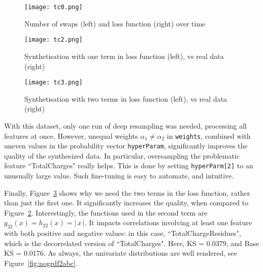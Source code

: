 \documentclass[oneside,10pt]{book}
\begin{document}
\begin{figure}[H]
\centering
\texttt{[image: tc0.png]} %
\caption{Number of swaps (left) and loss function (right) over time}
\label{fig:nofds2abcgff}
\end{figure}


\begin{figure}[H]
\centering
\texttt{[image: tc2.png]} %
\caption{Synthetisation with one term in loss function (left), vs real data (right)}
\label{fig:nofds2abchh}
\end{figure}

\begin{figure}[H]
\centering
\texttt{[image: tc3.png]} %
\caption{Synthetisation with two terms in loss function (left), vs real data (right)}
\label{fig:nogrdf2abchh}
\end{figure}

With this dataset, only one run of deep resampling was needed, processing all features at once. However, unequal weights $\alpha_1 \neq \alpha_2$ in \texttt{weights}, combined with uneven values in the probability vector \texttt{hyperParam}, significantly improves the quality of
 the synthesized data. In particular, oversampling the problematic feature ``TotalCharges" really helps. This is done
 by setting \texttt{hyperParm[2]} to an unusually large value. Such fine-tuning is easy to automate, and intuitive. 

Finally, Figure~\ref{fig:nogrdf2abchh} shows why we need the two terms in the loss function, rather than just the first one. 
It significantly increases the quality, when compared to Figure~\ref{fig:nofds2abchh}. Interestingly, the functions
 used in the second term are $g_{22}(x) = h_{22}(x) = |\,x\,|$. It impacts correlations involving at least one feature with both positive and negative values:
 in this case, ``TotalChargeResidues", which is the decorrelated version of ``TotalCharges".
 Here, KS = 0.0379, and Base KS = 0.0176. As always, the univariate distributions are well rendered, see Figure~\ref{fig:nogrdf2abc}.



\end{document}

